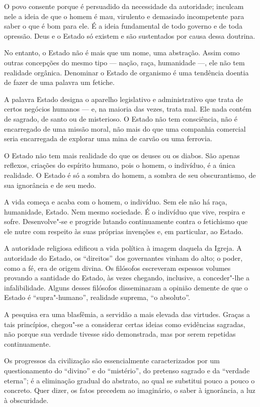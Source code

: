 O povo consente porque é persuadido da necessidade da autoridade;
inculcam nele a ideia de que o homem é mau, virulento e demasiado
incompetente para saber o que é bom para ele. É a ideia fundamental de
todo governo e de toda opressão. Deus e o Estado só existem e são
sustentados por causa dessa doutrina.

No entanto, o Estado não é mais que um nome, uma abstração. Assim como
outras concepções do mesmo tipo --- nação, raça, humanidade ---, ele não tem
realidade orgânica. Denominar o Estado de organismo é uma tendência
doentia de fazer de uma palavra um fetiche.

A palavra Estado designa o aparelho legislativo e administrativo que
trata de certos negócios humanos --- e, na maioria das vezes, trata mal. Ele nada
contém de sagrado, de santo ou de misterioso. O Estado não tem
consciência, não é encarregado de uma missão moral, não mais do que uma
companhia comercial seria encarregada de explorar uma mina de carvão ou
uma ferrovia.

O Estado não tem mais realidade do que os deuses ou os diabos. São
apenas reflexos, criações do espírito humano, pois o homem, o indivíduo,
é a única realidade. O Estado é só a sombra do homem, a sombra de seu
obscurantismo, de sua ignorância e de seu medo.

A vida começa e acaba com o homem, o indivíduo. Sem ele não há raça,
humanidade, Estado. Nem mesmo sociedade. É o indivíduo que vive,
respira e sofre. Desenvolve"-se e progride lutando continuamente
contra o fetichismo que ele nutre com respeito às suas próprias
invenções e, em particular, ao Estado.

A autoridade religiosa edificou a vida política à imagem daquela da
Igreja. A autoridade do Estado, os “direitos” dos governantes vinham do
alto; o poder, como a fé, era de origem divina. Os filósofos escreveram
espessos volumes provando a santidade do Estado, às vezes chegando, 
inclusive, a conceder"-lhe a infalibilidade. Alguns desses filósofos
disseminaram a opinião demente de que o Estado é “supra"-humano”,
realidade suprema, “o absoluto”.

A pesquisa era uma blasfêmia, a servidão a mais elevada das virtudes.
Graças a tais princípios, chegou"-se a considerar certas ideias como
evidências sagradas, não porque sua verdade tivesse sido demonstrada,
mas por serem repetidas continuamente.

Os progressos da civilização são essencialmente caracterizados por um
questionamento do “divino” e do “mistério”, do pretenso sagrado e da
“verdade eterna”; é a eliminação gradual do abstrato, ao qual se
substitui pouco a pouco o concreto. Quer dizer, os fatos precedem ao
imaginário, o saber à ignorância, a luz à obscuridade.

